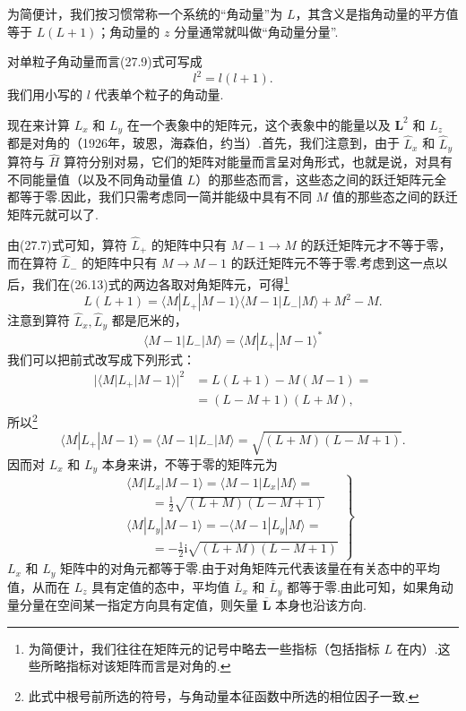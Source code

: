 为简便计，我们按习惯常称一个系统的“角动量”为 $L$，其含义是指角动量的平方值等于 $L(L+1)$；角动量的 $z$ 分量通常就叫做“角动量分量”.

对单粒子角动量而言(27.9)式可写成
\begin{equation}
  l^2=l(l+1).
\end{equation}
我们用小写的 $l$ 代表单个粒子的角动量.

现在来计算 $L_x$ 和 $L_y$ 在一个表象中的矩阵元，这个表象中的能量以及 $\boldsymbol{L}^2$ 和 $L_z$ 都是对角的（1926年，玻恩，海森伯，约当）.首先，我们注意到，由于 $\hat{L}_x$ 和 $\hat{L}_y$ 算符与 $\hat{H}$ 算符分别对易，它们的矩阵对能量而言呈对角形式，也就是说，对具有不同能量值（以及不同角动量值 $L$）的那些态而言，这些态之间的跃迁矩阵元全都等于零.因此，我们只需考虑同一简并能级中具有不同 $M$ 值的那些态之间的跃迁矩阵元就可以了.

由(27.7)式可知，算符 $\hat{L}_+$ 的矩阵中只有 $M-1\longrightarrow M$ 的跃迁矩阵元才不等于零，而在算符 $\hat{L}_-$ 的矩阵中只有 $M\longrightarrow M-1$ 的跃迁矩阵元不等于零.考虑到这一点以后，我们在(26.13)式的两边各取对角矩阵元，可得\footnote{为简便计，我们往往在矩阵元的记号中略去一些指标（包括指标 $L$ 在内）.这些所略指标对该矩阵而言是对角的.}
\begin{equation*}
  L(L+1)=\langle M|L_+|M-1\rangle\langle M-1|L_-|M\rangle+M^2-M.
\end{equation*}
注意到算符 $\hat{L}_x,\hat{L}_y$ 都是厄米的，
\begin{equation*}
  \langle M-1|L_-|M\rangle=\langle M|L_+|M-1\rangle^{*}
\end{equation*}
我们可以把前式改写成下列形式：
\begin{equation*}
\begin{aligned}
  |\langle M|L_+|M-1\rangle|^2
  &=L(L+1)-M(M-1)=\\
  &=(L-M+1)(L+M),
\end{aligned}
\end{equation*}
所以\footnote{此式中根号前所选的符号，与角动量本征函数中所选的相位因子一致.}
\begin{equation}
  \langle M|L_+|M-1\rangle=\langle M-1|L_-|M\rangle
  =\sqrt{(L+M)(L-M+1)}.
\end{equation}
因而对 $L_x$ 和 $L_y$ 本身来讲，不等于零的矩阵元为
\begin{equation}
\left.\begin{aligned}
  &\langle M|L_x|M-1\rangle=\langle M-1|L_x|M\rangle=\\
  &\qquad=\frac{1}{2}\sqrt{(L+M)(L-M+1)}\\
  &\langle M|L_y|M-1\rangle=-\langle M-1|L_y|M\rangle=\\
  &\qquad=-\frac{1}{2}\mathrm{i}\sqrt{(L+M)(L-M+1)}
\end{aligned}\right\}
\end{equation}
$L_x$ 和 $L_y$ 矩阵中的对角元都等于零.由于对角矩阵元代表该量在有关态中的平均值，从而在 $L_z$ 具有定值的态中，平均值 $\overline{L}_x$ 和 $\overline{L}_y$ 都等于零.由此可知，如果角动量分量在空间某一指定方向具有定值，则矢量 $\overline{\boldsymbol{L}}$ 本身也沿该方向.

